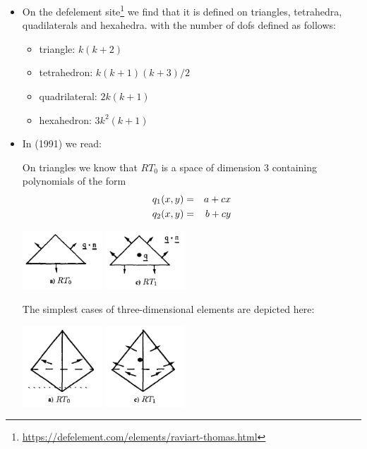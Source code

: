 \begin{itemize}
\begin{displayquote}
{}
\end{displayquote}



\item 
On the defelement site\footnote{\url{https://defelement.com/elements/raviart-thomas.html}} we find 
that it is defined on triangles, tetrahedra, quadilaterals and hexahedra.
with the number of dofs defined as follows:
\begin{itemize}
\item triangle: $k(k+2)$
\item tetrahedron: $k(k+1)(k+3)/2$
\item quadrilateral: $2k(k+1)$
\item hexahedron: $3k^2(k+1)$
\end{itemize}

\item
In \textcite{brfo} (1991) we read:

\begin{displayquote}
{\color{darkgray}
On triangles we know that $RT_0$ is a space of dimension 3 containing polynomials of the form
\begin{eqnarray}
q_1(x,y)&=&a+cx \nonumber\\
q_2(x,y)&=&b+cy \nonumber
\end{eqnarray}

\begin{center}
\includegraphics[width=3cm]{images/pair_raviart-thomas/brfo1}
\includegraphics[width=3cm]{images/pair_raviart-thomas/brfo2}
\end{center}
The simplest cases of three-dimensional elements are depicted here:
\begin{center}
\includegraphics[width=3cm]{images/pair_raviart-thomas/brfo3}
\includegraphics[width=3cm]{images/pair_raviart-thomas/brfo4}
\end{center}

}
\end{displayquote}
\end{itemize}
